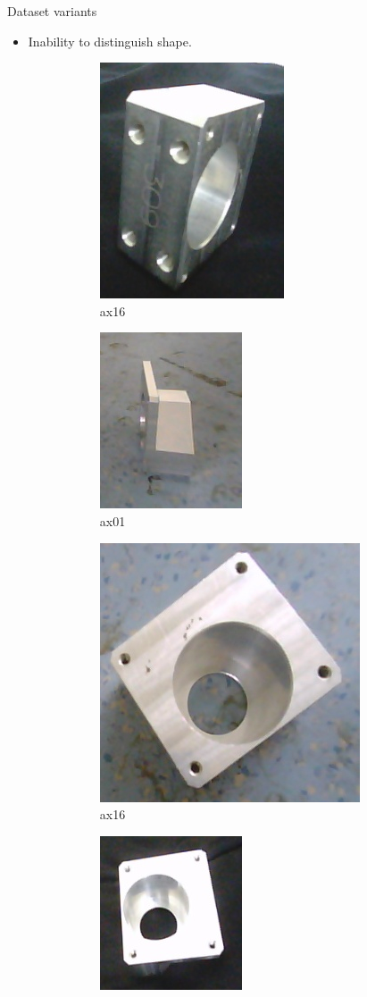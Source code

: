 \documentclass{beamer}
\begin{document}
\begin{frame}{Dataset variants}
\begin{small}
\begin{itemize}
			\item Inability to distinguish shape.
				\begin{figure}
				\centering
				\begin{subfigure}{.2\textwidth}
  					\centering
  					\includegraphics[width=.3\linewidth]{images/ax01_diff}
  					\caption{ax16}
  					\label{Fig:sim1a}
				\end{subfigure}%
				\begin{subfigure}{.2\textwidth}
  					\centering
  					\includegraphics[width=.3\linewidth]{images/ax16_diff}
  					\caption{ax01}
  					\label{Fig:sim1b}
				\end{subfigure}%
				\begin{subfigure}{.23\textwidth}
  					\centering
  					\includegraphics[width=.3\linewidth]{images/ax01_similar}
  					\caption{ax16}
  					\label{Fig:sim2a}
				\end{subfigure}%
				\begin{subfigure}{.21\textwidth}
  					\centering
  					\includegraphics[width=.3\linewidth]{images/ax16_similar}

\end{subfigure}
\end{figure}
\end{itemize}
\end{small}
\end{frame}
\end{document}
